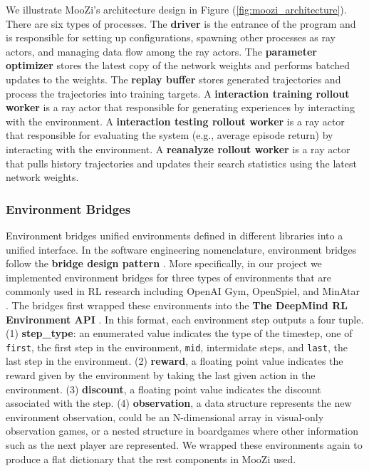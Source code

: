 \documentclass[12pt]{article}
\begin{document}
We illustrate MooZi's architecture design in Figure (\ref{fig:moozi_architecture}).
There are six types of processes.
The \textbf{driver} is the entrance of the program and is responsible for setting up configurations,
spawning other processes as ray actors, and managing data flow among the ray actors.
The \textbf{parameter optimizer} stores the latest copy of the network weights and performs batched updates to the weights.
The \textbf{replay buffer} stores generated trajectories and process the trajectories into training targets.
A \textbf{interaction training rollout worker} is a ray actor that responsible for generating experiences by interacting with the environment.
A \textbf{interaction testing rollout worker} is a ray actor that responsible for evaluating the system (e.g., average episode return) by interacting with the environment.
A \textbf{reanalyze rollout worker} is a ray actor that pulls history trajectories and updates their search statistics using the latest network weights.

\subsubsection{Environment Bridges} \label{sec:env_bridge}
Environment bridges unified environments defined in different libraries into a unified interface.
In the software engineering nomenclature, environment bridges follow the \textbf{bridge design pattern} \cite{BridgePattern__2022}.
More specifically, in our project we implemented environment bridges for three types of environments that are commonly used in RL research including OpenAI Gym, OpenSpiel, and MinAtar \cite{OpenAIGym_Brockman.Cheung.ea_2016,OpenSpielFrameworkReinforcement_Lanctot.Lockhart.ea_2020,MinAtarAtariInspiredTestbed_Young.Tian_2019}.
The bridges first wrapped these environments into the \textbf{The DeepMind RL Environment API} \cite{DmEnvDeepMind__2022}.
In this format, each environment step outputs a four tuple.
(1) \textbf{step\_type}: an enumerated value indicates the type of the timestep, one of \Verb|first|, the first step in the environment, \Verb|mid|, intermidate steps, and \Verb|last|, the last step in the environment.
(2) \textbf{reward}, a floating point value indicates the reward given by the environment by taking the last given action in the environment.
(3) \textbf{discount}, a floating point value indicates the discount associated with the step.
(4) \textbf{observation}, a data structure represents the new environment observation, could be an N-dimensional array in visual-only observation games, or a nested structure in boardgames where other information such as the next player are represented.
We wrapped these environments again to produce a flat dictionary that the rest components in MooZi used.
\end{document}
